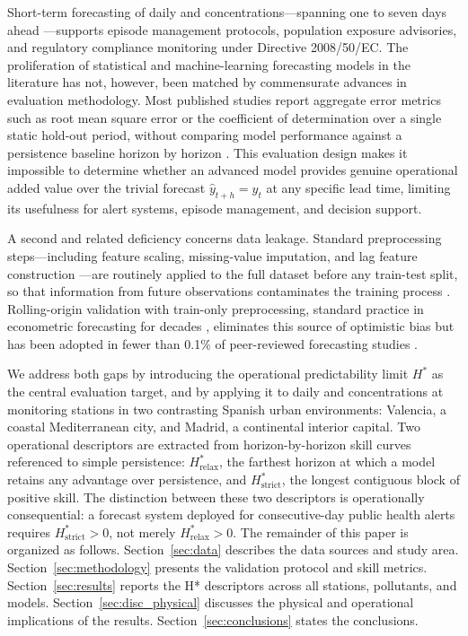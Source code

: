 \documentclass[12pt, a4paper]{article}
\newcommand{\Hstar}{H^{*}}
\newcommand{\Hrelax}{H^{*}_{\mathrm{relax}}}
\newcommand{\Hstrict}{H^{*}_{\mathrm{strict}}}
\begin{document}
Short-term forecasting of daily  and 
concentrations—spanning one to seven days ahead
—supports episode management protocols, population exposure advisories,
and regulatory compliance monitoring under Directive 2008/50/EC.
The proliferation of statistical and machine-learning forecasting
models in the literature has not, however, been matched by
commensurate advances in evaluation methodology.
Most published studies report aggregate error metrics such as
root mean square error or the coefficient of determination over
a single static hold-out period, without comparing model
performance against a persistence baseline horizon by horizon
\citep{GarciaCrespi2026}.
This evaluation design makes it impossible to determine whether
an advanced model provides genuine operational added value over
the trivial forecast $\hat{y}_{t+h} = y_t$ at any specific
lead time, limiting its usefulness for alert systems, episode
management, and decision support.

A second and related deficiency concerns data leakage.
Standard preprocessing steps—including feature scaling,
missing-value imputation, and lag feature construction
—are routinely applied to the full dataset before any train-test
split, so that information from future observations contaminates
the training process \citep{GarciaCrespi2026}.
Rolling-origin validation with train-only preprocessing,
standard practice in econometric forecasting for decades
\citep{Tashman2000}, eliminates this source of optimistic bias
but has been adopted in fewer than 0.1\% of peer-reviewed
 forecasting studies \citep{GarciaCrespi2026}.

We address both gaps by introducing the operational predictability
limit $\Hstar$ as the central evaluation target, and by applying
it to daily  and  concentrations at
monitoring stations in two contrasting Spanish urban environments:
Valencia, a coastal Mediterranean city, and Madrid, a continental
interior capital.
Two operational descriptors are extracted from horizon-by-horizon
skill curves referenced to simple persistence: $\Hrelax$, the
farthest horizon at which a model retains any advantage over
persistence, and $\Hstrict$, the longest contiguous block of
positive skill.
The distinction between these two descriptors is operationally
consequential: a forecast system deployed for consecutive-day
public health alerts requires $\Hstrict > 0$, not merely
$\Hrelax > 0$.
The remainder of this paper is organized as follows.
Section~\ref{sec:data} describes the data sources and study area.
Section~\ref{sec:methodology} presents the validation protocol
and skill metrics.
Section~\ref{sec:results} reports the H* descriptors across
all stations, pollutants, and models.
Section~\ref{sec:disc_physical} discusses the physical and
operational implications of the results.
Section~\ref{sec:conclusions} states the conclusions.
\end{document}
